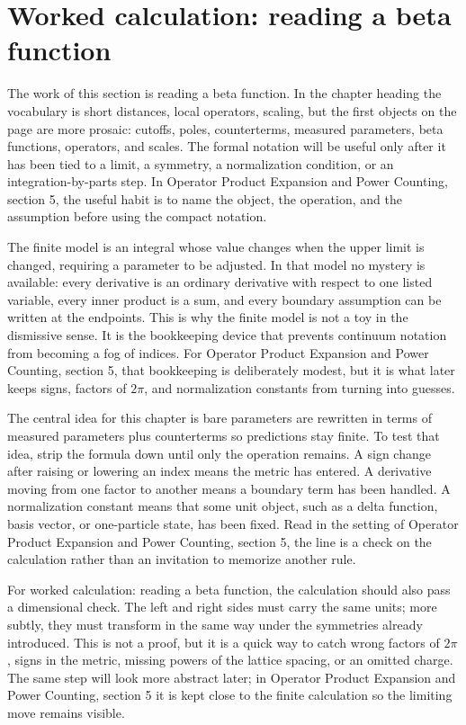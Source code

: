 \section{Worked calculation: reading a beta function}

The work of this section is reading a beta function.  In the chapter heading the vocabulary is short distances, local operators, scaling, but the first objects on the page are more prosaic: cutoffs, poles, counterterms, measured parameters, beta functions, operators, and scales.  The formal notation will be useful only after it has been tied to a limit, a symmetry, a normalization condition, or an integration-by-parts step.  In Operator Product Expansion and Power Counting, section 5, the useful habit is to name the object, the operation, and the assumption before using the compact notation.

The finite model is an integral whose value changes when the upper limit is changed, requiring a parameter to be adjusted.  In that model no mystery is available: every derivative is an ordinary derivative with respect to one listed variable, every inner product is a sum, and every boundary assumption can be written at the endpoints.  This is why the finite model is not a toy in the dismissive sense.  It is the bookkeeping device that prevents continuum notation from becoming a fog of indices.  For Operator Product Expansion and Power Counting, section 5, that bookkeeping is deliberately modest, but it is what later keeps signs, factors of \(2\pi\), and normalization constants from turning into guesses.

The central idea for this chapter is bare parameters are rewritten in terms of measured parameters plus counterterms so predictions stay finite.  To test that idea, strip the formula down until only the operation remains.  A sign change after raising or lowering an index means the metric has entered.  A derivative moving from one factor to another means a boundary term has been handled.  A normalization constant means that some unit object, such as a delta function, basis vector, or one-particle state, has been fixed.  Read in the setting of Operator Product Expansion and Power Counting, section 5, the line is a check on the calculation rather than an invitation to memorize another rule.

For worked calculation: reading a beta function, the calculation should also pass a dimensional check.  The left and right sides must carry the same units; more subtly, they must transform in the same way under the symmetries already introduced.  This is not a proof, but it is a quick way to catch wrong factors of \(2\pi\), signs in the metric, missing powers of the lattice spacing, or an omitted charge.  The same step will look more abstract later; in Operator Product Expansion and Power Counting, section 5 it is kept close to the finite calculation so the limiting move remains visible.

